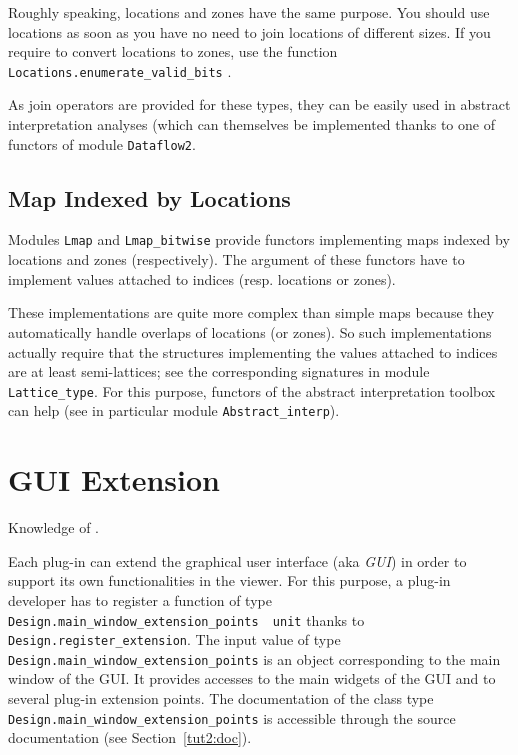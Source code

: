\begin{convention}
  Roughly speaking, locations and zones have the same purpose. You should use
  locations as soon as you have no need to join locations of different sizes.
  If you require to convert locations to zones, use the function
  \texttt{Locations.enumerate\_valid\_bits}%
  .
\end{convention}

As join operators are provided for these types, they can be easily used in
abstract interpretation analyses (which can
themselves be implemented thanks to one of functors of module
\texttt{Dataflow2}.

\subsection{Map Indexed by Locations}\label{memory:map}

Modules \texttt{Lmap} and
\texttt{Lmap\_bitwise} provide functors implementing
maps indexed by locations and zones (respectively). The argument of these
functors have to implement values attached to indices (resp. locations or zones).

These implementations are quite more complex than simple maps because they
automatically handle overlaps of locations (or zones). So such implementations
actually require that the structures implementing the values attached to indices
are at least semi-lattices; see the corresponding signatures
in module \texttt{Lattice\_type}. For
this purpose, functors of the abstract interpretation toolbox%
 can help (see in particular module
\texttt{Abstract\_interp}).


\section{GUI Extension}\label{adv:gui}

\begin{prereq}
  Knowledge of \lablgtk.
\end{prereq}

Each plug-in can extend the \framac graphical user interface (aka \emph{GUI})
in order to support its own functionalities in the \framac viewer. For this
purpose, a plug-in developer has to register a function of type
\texttt{Design.main\_window\_extension\_points \fl~unit} thanks to
\texttt{Design.register\_extension}. The
input value of type \texttt{Design.main\_window\_extension\_points} is an
object corresponding to the main window of the \framac GUI. It provides
accesses to the main widgets of the \framac GUI and to several plug-in extension
points. The documentation of the class type
\texttt{Design.main\_window\_extension\_points}%
 is accessible through the
source documentation (see Section~\ref{tut2:doc}).

